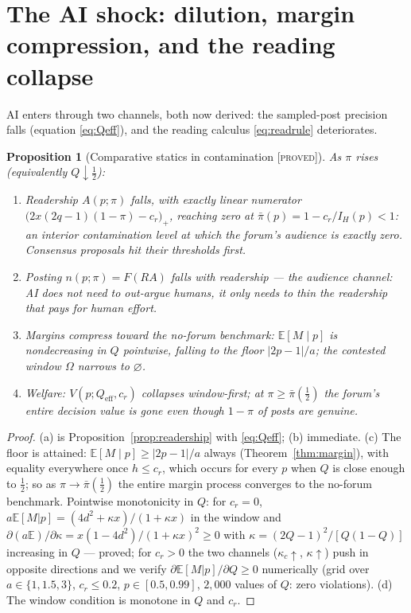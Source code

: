 \documentclass[11pt]{article}
\newtheorem{proposition}{Proposition}
\theoremstyle{remark}
\newcommand{\E}{\mathbb{E}}
\newcommand{\statusP}{\textsc{[proved]}}
\begin{document}
\section{The AI shock: dilution, margin compression, and the reading collapse}
\label{sec:shock}

AI enters through two channels, both now derived: the sampled-post precision
falls (equation \eqref{eq:Qeff}), and the reading calculus \eqref{eq:readrule}
deteriorates.

\begin{proposition}[Comparative statics in contamination \statusP]\label{prop:shock}
As $\pi$ rises (equivalently $Q\downarrow\tfrac12$):
\begin{enumerate}[label=(\alph*),itemsep=1pt]
\item \emph{Readership} $A(p;\pi)$ falls, with exactly linear numerator
$\bigl(2x(2q-1)(1-\pi)-c_r\bigr)_+$, reaching zero at
$\bar\pi(p)=1-c_r/I_H(p)<1$: an \emph{interior} contamination level at which
the forum's audience is exactly zero. Consensus proposals hit their thresholds
first.
\item \emph{Posting} $n(p;\pi)=F(RA)$ falls with readership --- the audience
channel: AI does not need to out-argue humans, it only needs to thin the
readership that pays for human effort.
\item \emph{Margins} compress toward the no-forum benchmark: $\E[M\mid p]$ is
nondecreasing in $Q$ pointwise, falling to the floor $|2p-1|/a$; the contested
window $\Omega$ narrows to $\varnothing$.
\item \emph{Welfare}: $V(p;Q_{\mathrm{eff}},c_r)$ collapses window-first; at
$\pi\ge\bar\pi(\tfrac12)$ the forum's entire decision value is gone even though
$1-\pi$ of posts are genuine.
\end{enumerate}
\end{proposition}

\begin{proof}
(a) is Proposition~\ref{prop:readership} with \eqref{eq:Qeff}; (b) immediate.
(c) The floor is attained: $\E[M\mid p]\ge|2p-1|/a$ always
(Theorem~\ref{thm:margin}), with equality everywhere once $h\le c_r$, which
occurs for every $p$ when $Q$ is close enough to $\tfrac12$; so as
$\pi\to\bar\pi(\tfrac12)$ the entire margin process converges to the no-forum
benchmark. Pointwise monotonicity in $Q$: for $c_r=0$,
$a\E[M|p]=(4d^2+\kappa x)/(1+\kappa x)$ in the window and
$\partial(a\E)/\partial\kappa=x(1-4d^2)/(1+\kappa x)^2\ge0$ with
$\kappa=(2Q-1)^2/[Q(1-Q)]$ increasing in $Q$ --- proved; for $c_r>0$ the two
channels ($\kappa_c\uparrow$, $\kappa\uparrow$) push in opposite directions and
we verify $\partial\E[M|p]/\partial Q\ge0$ numerically (grid over
$a\in\{1,1.5,3\}$, $c_r\le0.2$, $p\in[0.5,0.99]$, $2{,}000$ values of $Q$:
zero violations). (d) The window condition is monotone in $Q$ and $c_r$.
\end{proof}
\end{document}
